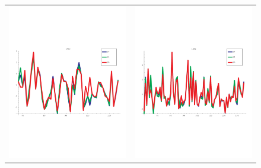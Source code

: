 \documentclass[a4paper,12pt]{article}
\begin{document}
   \begin{figure}[t]
     \centering
     \begin{tabular}{cc}
       \includegraphics[trim=0cm 8cm 0cm 6cm,clip,width=8.5cm]{images/1ABO_simil_bypos.pdf} &
       \includegraphics[trim=0cm 8cm 0cm 6cm,clip,width=8.5cm]{images/1BM2_simil_bypos.pdf} \\

\end{tabular}
\end{figure}
\end{document}
